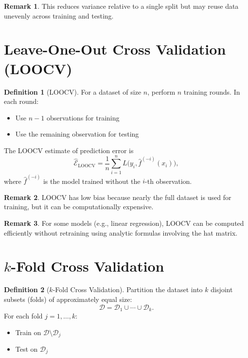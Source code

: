 \documentclass[12pt,oneside]{book}
\numberwithin{equation}{section}
\theoremstyle{definition}
\newtheorem{definition}{Definition}[section]
\newtheorem{remark}{Remark}[section]
\theoremstyle{plain}
\theoremstyle{remark}
\begin{document}
\begin{remark}
This reduces variance relative to a single split but may reuse data unevenly across training and testing.
\end{remark}

\section{Leave-One-Out Cross Validation (LOOCV)}

\begin{definition}[LOOCV]
For a dataset of size $n$, perform $n$ training rounds. In each round:
\begin{itemize}
    \item Use $n-1$ observations for training
    \item Use the remaining observation for testing
\end{itemize}
\end{definition}

The LOOCV estimate of prediction error is
\[
\widehat{\mathcal{E}}_{\mathrm{LOOCV}}
=
\frac{1}{n}
\sum_{i=1}^n
L\big(y_i,\hat{f}^{(-i)}(x_i)\big),
\]
where $\hat{f}^{(-i)}$ is the model trained without the $i$-th observation.

\begin{remark}
LOOCV has low bias because nearly the full dataset is used for training, but it can be computationally expensive.
\end{remark}

\begin{remark}
For some models (e.g., linear regression), LOOCV can be computed efficiently without retraining using analytic formulas involving the hat matrix.
\end{remark}

\section{$k$-Fold Cross Validation}

\begin{definition}[$k$-Fold Cross Validation]
Partition the dataset into $k$ disjoint subsets (folds) of approximately equal size:
\[
\mathcal{D} = \mathcal{D}_1 \cup \cdots \cup \mathcal{D}_k.
\]
For each fold $j=1,\dots,k$:
\begin{itemize}
    \item Train on $\mathcal{D} \setminus \mathcal{D}_j$
    \item Test on $\mathcal{D}_j$
\end{itemize}
\end{definition}
\end{document}
